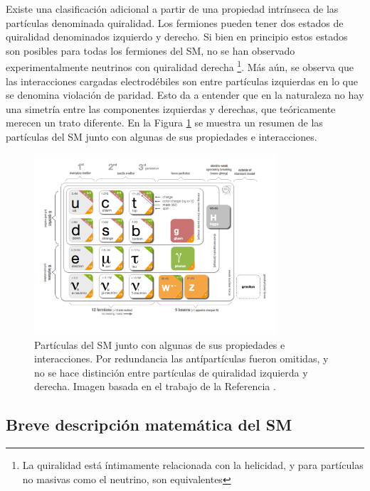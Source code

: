 Existe una clasificación adicional a partir de una propiedad intrínseca de las partículas denominada quiralidad. 
Los fermiones pueden tener dos estados de quiralidad denominados izquierdo y derecho. Si bien en principio estos estados son posibles para todas los fermiones del SM, no se han observado experimentalmente neutrinos con quiralidad derecha \footnote{La quiralidad está íntimamente relacionada con la helicidad, y para partículas no masivas como el neutrino, son equivalentes}. Más aún, se observa que las interacciones cargadas electrodébiles son entre partículas izquierdas 
en lo que se denomina violación de paridad. Esto da a entender que en la naturaleza no hay una simetría entre las componentes izquierdas y derechas, que teóricamente merecen un trato diferente.
En la Figura \ref{fig:sm_particles} se muestra un resumen de las partículas del SM junto con algunas de sus propiedades e interacciones.

\begin{figure}
  \centering
  \includegraphics[width=0.8\textwidth]{images/theory/sm_particles.png}
  \caption{Partículas del SM junto con algunas de sus propiedades e interacciones. Por redundancia las antípartículas fueron omitidas, y no se hace distinción entre partículas de quiralidad izquierda y derecha. Imagen basada en el trabajo de la Referencia \cite{fig_sm_particles}.}
  \label{fig:sm_particles}
\end{figure}


\subsection{Breve descripción matemática del SM}

